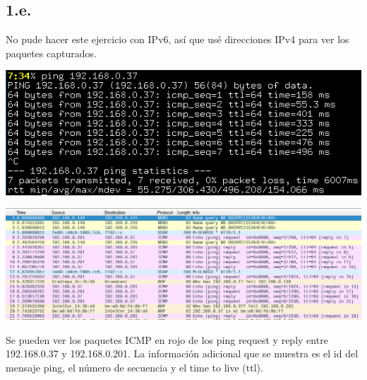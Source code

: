 \documentclass[11pt]{article}
\begin{document}
\subsection*{1.e.}
\label{sec:org29aa312}
No pude hacer este ejercicio con IPv6, así que usé direcciones IPv4 para ver los paquetes capturados.
\begin{center}
\includegraphics[width=.9\linewidth]{./1ea.png}
\end{center}
\begin{center}
\includegraphics[width=.9\linewidth]{./1eb.png}
\end{center}

Se pueden ver los paquetes ICMP en rojo de los ping request y reply entre 192.168.0.37 y 192.168.0.201. La información adicional que se muestra es el id del mensaje ping, el número de secuencia y el time to live (ttl).
\end{document}
